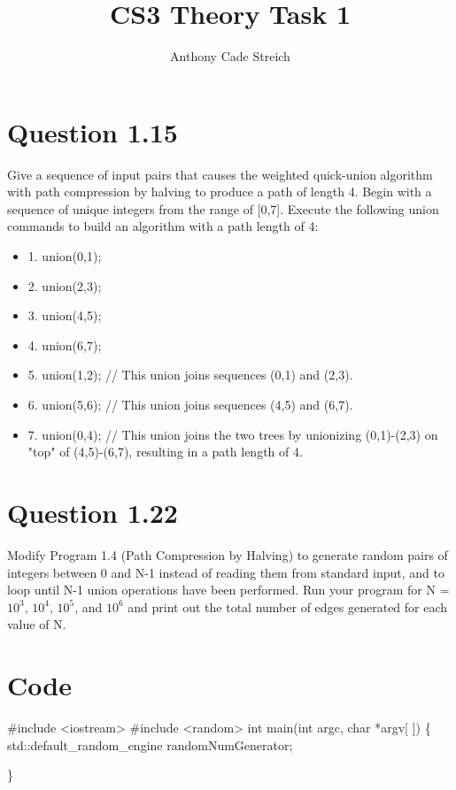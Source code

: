 \documentclass[]{article}
\title{CS3 Theory Task 1}
\author{Anthony Cade Streich}
\begin{document}
\maketitle
\section*{Question 1.15}
Give a sequence of input pairs that causes the weighted quick-union algorithm with path compression by halving to produce a path of length 4.
\newline
\newline
\newline
Begin with a sequence of unique integers from the range of [0,7]. Execute the following union commands to build an algorithm with a path length of 4:

\begin{itemize}
	\item {1. union(0,1);}
	\item {2. union(2,3);}
	\item {3. union(4,5);}
	\item {4. union(6,7);}
	
	\item {5. union(1,2); // This union joins sequences (0,1) and (2,3).}
	\item {6. union(5,6); // This union joins sequences (4,5) and (6,7).}
	\item {7. union(0,4); // This union joins the two trees by unionizing (0,1)-(2,3) on "top" of (4,5)-(6,7), resulting in a path length of 4.}
\end{itemize}

\pagebreak

\section*{Question 1.22}
Modify Program 1.4 (Path Compression by Halving) to generate random pairs of integers between 0 and N-1 instead of reading them from standard input, and to loop until N-1 union operations have been performed. Run your program for N = $10^{3}$, $10^{4}$, $10^{5}$, and $10^{6}$ and print out the total number of edges generated for each value of N.

\section*{Code}
\#include <iostream>\newline
\#include <random>\newline
\newline
int main(int argc, char *argv[ ])\newline
\{\newline
\indent std::default_random_engine randomNumGenerator;\newline
	

\newline \}
\end{document}
